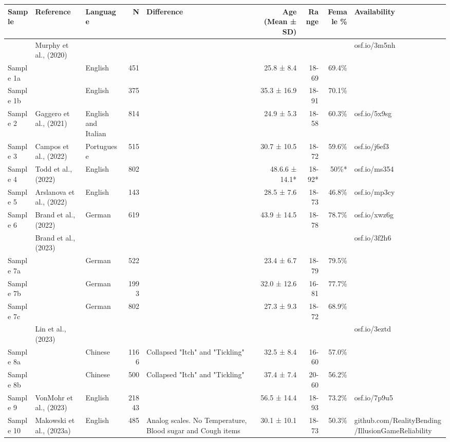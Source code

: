 \begin{table}
\fontsize{6.8pt}{8.1pt}\selectfont
\begin{tabular*}{\linewidth}{@{\extracolsep{\fill}}lllrlrrrl}
\toprule
Sample & Reference & Language & N & Difference & Age (Mean  ± SD) & Range & Female \% & Availability \\ 
\midrule\addlinespace[2.5pt]
 & Murphy et al., (2020) &  &  &  &  &  &  & osf.io/3m5nh \\ 
Sample 1a &  & English & 451 &  & 25.8 ± 8.4 & 18-69 & 69.4\% &  \\ 
Sample 1b &  & English & 375 &  & 35.3 ± 16.9 & 18-91 & 70.1\% &  \\ 
Sample 2 & Gaggero et al., (2021) & English and Italian & 814 &  & 24.9 ± 5.3 & 18-58 & 60.3\% & osf.io/5x9sg \\ 
Sample 3 & Campos et al., (2022) & Portuguese & 515 &  & 30.7 ± 10.5 & 18-72 & 59.6\% & osf.io/j6ef3 \\ 
Sample 4 & Todd et al., (2022) & English & 802 &  & 48.6.6 ± 14.1* & 18-92* & 50\%* & osf.io/ms354 \\ 
Sample 5 & Arslanova et al., (2022) & English & 143 &  & 28.5 ± 7.6 & 18-73 & 46.8\% & osf.io/mp3cy \\ 
Sample 6 & Brand et al., (2022) & German & 619 &  & 43.9 ± 14.5 & 18-78 & 78.7\% & osf.io/xwz6g \\ 
 & Brand et al., (2023) &  &  &  &  &  &  & osf.io/3f2h6 \\ 
Sample 7a &  & German & 522 &  & 23.4 ± 6.7 & 18-79 & 79.5\% &  \\ 
Sample 7b &  & German & 1993 &  & 32.0 ± 12.6 & 16-81 & 77.7\% &  \\ 
Sample 7c &  & German & 802 &  & 27.3 ± 9.3 & 18-72 & 68.9\% &  \\ 
 & Lin et al., (2023) &  &  &  &  &  &  & osf.io/3eztd \\ 
Sample 8a &  & Chinese & 1166 & Collapsed "Itch" and "Tickling" & 32.5 ± 8.4 & 16-60 & 57.0\% &  \\ 
Sample 8b &  & Chinese & 500 & Collapsed "Itch" and "Tickling" & 37.4 ± 7.4 & 20-60 & 56.2\% &  \\ 
Sample 9 & VonMohr et al., (2023) & English & 21843 &  & 56.5 ± 14.4 & 18-93 & 73.2\% & osf.io/7p9u5 \\ 
Sample 10 & Makowski et al., (2023a) & English & 485 & Analog scales. No Temperature, Blood sugar and Cough items & 30.1 ± 10.1 & 18-73 & 50.3\% & github.com/RealityBending/IllusionGameReliability \\ 

\end{tabular*}
\end{table}
